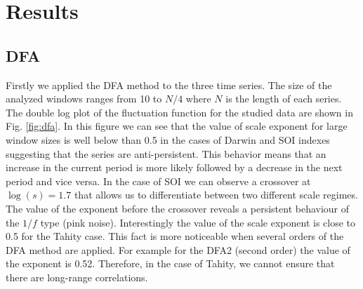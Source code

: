 \documentclass[onecolumn, preprint,aps,amsmath, amssymb, superscriptaddress]{revtex4}
\begin{document}
\section{Results}
\label{resultados}

\subsection{DFA}
\label{results_dfa}


Firstly we applied the DFA method to the three time series. The size of the analyzed windows ranges from 10 to $N/4$ where $N$ is the length of each series. The double log plot of the fluctuation function for the studied data are shown in Fig. \ref{fig:dfa}. In this figure we can see that the value of scale exponent for large window sizes is well below than 0.5 in the cases of Darwin and SOI indexes suggesting that the series are anti-persistent. This behavior means that an increase in the current period is more likely followed by a decrease in the next period and vice versa. In the case of SOI we can observe a crossover at $\log(s) = 1.7$ that allows us to differentiate between two different scale regimes. The value of the exponent before the crossover reveals a persistent behaviour of the $1/f$ type (pink noise). Interestingly the value of the scale exponent is close to 0.5 for the Tahity case. This fact is more noticeable when several orders of the DFA method are applied. For example for the DFA2 (second order) the value of the exponent is 0.52. Therefore, in the case of Tahity, we cannot ensure that there are long-range correlations. 
\end{document}
